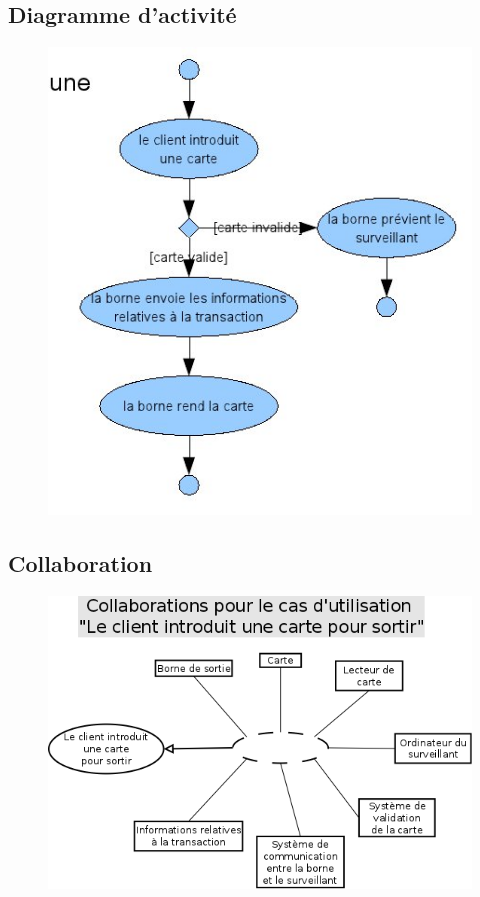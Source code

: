 \documentclass[a4paper]{article}
\begin{document}
\subsection{Diagramme d'activit\'e}
\begin{figure}[!ht]
\centering
\includegraphics[scale=.7]{imgs/act_cartesortir.jpg}
\end{figure}

\subsection{Collaboration}
\begin{figure}[!ht]
\centering
\includegraphics[scale=.5]{collaborations/_carte_sortie.png}
\end{figure}
\end{document}

